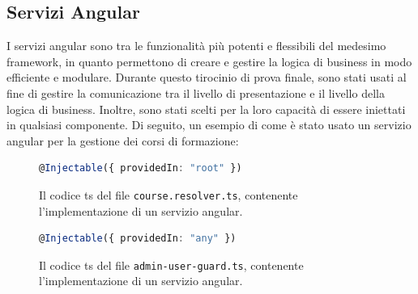 \subsection{Servizi Angular}\label{subsec:servizi-angular}
I servizi \gls{angular} sono tra le funzionalità più potenti e flessibili del medesimo \gls{framework}, in quanto permettono di creare e gestire la logica di business in modo efficiente e modulare. Durante questo tirocinio di prova finale, sono stati usati al fine di gestire la comunicazione tra il livello di presentazione e il livello della logica di business. Inoltre, sono stati scelti per la loro capacità di essere iniettati in qualsiasi componente.
Di seguito, un esempio di come è stato usato un servizio \gls{angular} per la gestione dei corsi di formazione:
\begin{figure}[H]
\centering
\begin{lstlisting}[language=TypeScript, linewidth=20cm, basicstyle=\tiny]
  @Injectable({ providedIn: "root" })
\end{lstlisting}
\caption{\label{fig:angular service}Il codice \acrshort{ts} del file \texttt{course.resolver.ts}, contenente l'implementazione di un servizio \gls{angular}.}
\end{figure}

\begin{figure}[H]
\centering
\begin{lstlisting}[language=TypeScript, linewidth=20cm, basicstyle=\tiny]
  @Injectable({ providedIn: "any" })
\end{lstlisting}
\caption{\label{fig:angular service 2}Il codice \acrshort{ts} del file \texttt{admin-user-guard.ts}, contenente l'implementazione di un servizio \gls{angular}.}
\end{figure}

